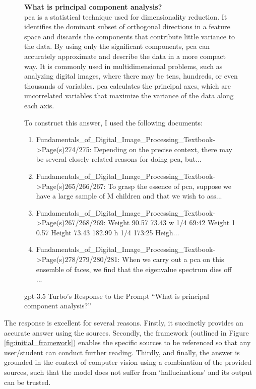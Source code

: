 \begin{figure}[ht!]
    \begin{itquote}
        \textbf{What is principal component analysis?} \\
        \acrfull{pca} is a statistical technique used for dimensionality reduction. It identifies the dominant subset of orthogonal directions in a feature space and discards the components that contribute little variance to the data. By using only the significant components, \acrshort{pca} can accurately approximate and describe the data in a more compact way. It is commonly used in multidimensional problems, such as analyzing digital images, where there may be tens, hundreds, or even thousands of variables. \acrshort{pca} calculates the principal axes, which are uncorrelated variables
        that maximize the variance of the data along each axis.
        
        To construct this answer, I used the following documents:
           
        \begin{enumerate}
            \item Fundamentals\_of\_Digital\_Image\_Processing\_Textbook->Page(s)274/275:  Depending on the precise context, there may be several closely related reasons for doing  \acrshort{pca}, but...
            \item Fundamentals\_of\_Digital\_Image\_Processing\_Textbook->Page(s)265/266/267:  To grasp the essence of \acrshort{pca}, suppose we have a large sample of M children and that we wish  to ass...
            \item Fundamentals\_of\_Digital\_Image\_Processing\_Textbook->Page(s)267/268/269:  Weight  90.57  73.43  w 1/4  69:42  Weight  1  0.57  Height  73.43  182.99  h  1/4  173:25  Heigh...
            \item Fundamentals\_of\_Digital\_Image\_Processing\_Textbook->Page(s)278/279/280/281:  When we carry out a \acrshort{pca} on this ensemble of faces, we find that the eigenvalue spectrum  dies off ...
        \end{enumerate}
    \end{itquote}
    \caption{\acrshort{gpt}-3.5 Turbo's Response to the Prompt ``What is principal component analysis?''}
    \label{fig:results_gpt_ex1}
\end{figure}

The response is excellent for several reasons. Firstly, it succinctly provides an accurate answer using the sources. Secondly, the framework (outlined in Figure \ref{fig:initial_framework}) enables the specific sources to be referenced so that any user/student can conduct further reading. Thirdly, and finally, the answer is grounded in the context of computer vision using a combination of the provided sources, such that the model does not suffer from `hallucinations' and its output can be trusted.

